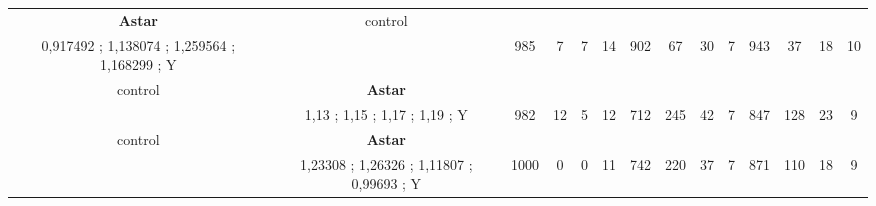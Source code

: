 \begin{table}[]
{\begin{tabular}{|c|c|c|c|c|c|c|c|c|c|c|c|c|c|}
\cellcolor{blue!15}\textbf{Astar} & control& {\color[HTML]{00009B} } & {\color[HTML]{9A0000} } & {\color[HTML]{009901} } &  & {\color[HTML]{00009B} } & {\color[HTML]{9A0000} } & {\color[HTML]{009901} } &  & {\color[HTML]{00009B} } & {\color[HTML]{9A0000} } & {\color[HTML]{009901} } &  \\ 
\cellcolor{ blue!15}0,917492 ; 1,138074 ; 1,259564 ; 1,168299 ; Y &  & \multirow{-2}{*}{{\color[HTML]{00009B} 985}} & \multirow{-2}{*}{{\color[HTML]{9A0000} 7}} & \multirow{-2}{*}{{\color[HTML]{009901} 7}} & \multirow{-2}{*}{14} & \multirow{-2}{*}{{\color[HTML]{00009B} 902}} & \multirow{-2}{*}{{\color[HTML]{9A0000} 67}} & \multirow{-2}{*}{{\color[HTML]{009901} 30}} & \multirow{-2}{*}{7} & \multirow{-2}{*}{{\color[HTML]{00009B} 943}} & \multirow{-2}{*}{{\color[HTML]{9A0000} 37}} & \multirow{-2}{*}{{\color[HTML]{009901} 18}} & \multirow{-2}{*}{10} \\ \hline

control & \cellcolor{blue!15}\textbf{Astar}& {\color[HTML]{00009B} } & {\color[HTML]{9A0000} } & {\color[HTML]{009901} } &  & {\color[HTML]{00009B} } & {\color[HTML]{9A0000} } & {\color[HTML]{009901} } &  & {\color[HTML]{00009B} } & {\color[HTML]{9A0000} } & {\color[HTML]{009901} } &  \\ 
 & \cellcolor{ blue!15}1,13 ; 1,15 ; 1,17 ; 1,19 ; Y & \multirow{-2}{*}{{\color[HTML]{00009B} 982}} & \multirow{-2}{*}{{\color[HTML]{9A0000} 12}} & \multirow{-2}{*}{{\color[HTML]{009901} 5}} & \multirow{-2}{*}{12} & \multirow{-2}{*}{{\color[HTML]{00009B} 712}} & \multirow{-2}{*}{{\color[HTML]{9A0000} 245}} & \multirow{-2}{*}{{\color[HTML]{009901} 42}} & \multirow{-2}{*}{7} & \multirow{-2}{*}{{\color[HTML]{00009B} 847}} & \multirow{-2}{*}{{\color[HTML]{9A0000} 128}} & \multirow{-2}{*}{{\color[HTML]{009901} 23}} & \multirow{-2}{*}{9} \\ \hline

control & \cellcolor{blue!15}\textbf{Astar}& {\color[HTML]{00009B} } & {\color[HTML]{9A0000} } & {\color[HTML]{009901} } &  & {\color[HTML]{00009B} } & {\color[HTML]{9A0000} } & {\color[HTML]{009901} } &  & {\color[HTML]{00009B} } & {\color[HTML]{9A0000} } & {\color[HTML]{009901} } &  \\ 
 & \cellcolor{ blue!15}1,23308 ; 1,26326 ; 1,11807 ; 0,99693 ; Y & \multirow{-2}{*}{{\color[HTML]{00009B} 1000}} & \multirow{-2}{*}{{\color[HTML]{9A0000} 0}} & \multirow{-2}{*}{{\color[HTML]{009901} 0}} & \multirow{-2}{*}{11} & \multirow{-2}{*}{{\color[HTML]{00009B} 742}} & \multirow{-2}{*}{{\color[HTML]{9A0000} 220}} & \multirow{-2}{*}{{\color[HTML]{009901} 37}} & \multirow{-2}{*}{7} & \multirow{-2}{*}{{\color[HTML]{00009B} 871}} & \multirow{-2}{*}{{\color[HTML]{9A0000} 110}} & \multirow{-2}{*}{{\color[HTML]{009901} 18}} & \multirow{-2}{*}{9} \\ \hline


\end{tabular}}
\end{table}
